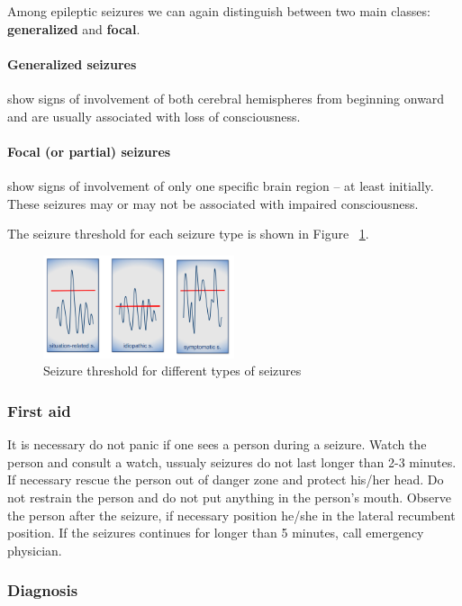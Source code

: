 \documentclass[12pt,article,oneside,a4paper]{memoir}
\begin{document}
Among epileptic seizures we can again distinguish between two main classes: \textbf{generalized} and \textbf{focal}.

\paragraph{Generalized seizures} show signs of involvement of both cerebral hemispheres from beginning onward and are usually associated with loss of consciousness.

\paragraph{Focal (or partial) seizures} show signs of involvement of only one specific brain region – at least initially. These seizures may or may not be associated with impaired consciousness.

The seizure threshold for each seizure type is shown in Figure ~\ref{fig:seizure-threshold}.

\begin{figure}
  \centering
  \includegraphics[width=0.5\textwidth]{imgs/seizure-threshold.png}
  \caption{Seizure threshold for different types of seizures}
  \label{fig:seizure-threshold}
\end{figure}

\subsubsection{First aid}
It is necessary do not panic if one sees a person during a seizure. Watch the person and consult a watch, ussualy seizures do not last longer than 2-3 minutes. If necessary rescue the person out of danger zone and protect his/her head.
Do not restrain the person and do not put anything in the person's mouth. Observe the person after the seizure, if necessary position he/she in the lateral recumbent position. If the seizures continues for longer than 5 minutes, call emergency physician.

\subsubsection{Diagnosis}
\end{document}
